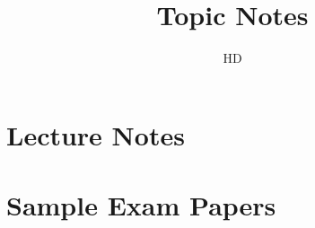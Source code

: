 \documentclass[]{report}
\title{%
  Topic Notes}
\author{HD
}
\begin{document}


\fancyhf{}
\fancyfoot[R]{ \bf\thepage\ \rm }%


\newpage
\tableofcontents
\newpage
\listoffigures
\listoftables
\newpage
\part{Lecture Notes}









\part{Sample Exam Papers}

%
%
%
\end{document}
